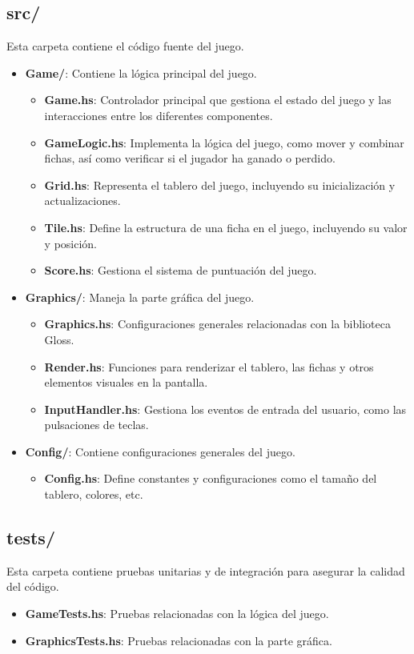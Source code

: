 \documentclass{article}
\begin{document}
\subsection{src/}
Esta carpeta contiene el código fuente del juego.
\begin{itemize}
    \item \textbf{Game/}: Contiene la lógica principal del juego.
    \begin{itemize}
        \item \textbf{Game.hs}: Controlador principal que gestiona el estado del juego y las interacciones entre los diferentes componentes.
        \item \textbf{GameLogic.hs}: Implementa la lógica del juego, como mover y combinar fichas, así como verificar si el jugador ha ganado o perdido.
        \item \textbf{Grid.hs}: Representa el tablero del juego, incluyendo su inicialización y actualizaciones.
        \item \textbf{Tile.hs}: Define la estructura de una ficha en el juego, incluyendo su valor y posición.
        \item \textbf{Score.hs}: Gestiona el sistema de puntuación del juego.
    \end{itemize}
    \item \textbf{Graphics/}: Maneja la parte gráfica del juego.
    \begin{itemize}
        \item \textbf{Graphics.hs}: Configuraciones generales relacionadas con la biblioteca Gloss.
        \item \textbf{Render.hs}: Funciones para renderizar el tablero, las fichas y otros elementos visuales en la pantalla.
        \item \textbf{InputHandler.hs}: Gestiona los eventos de entrada del usuario, como las pulsaciones de teclas.
    \end{itemize}
    \item \textbf{Config/}: Contiene configuraciones generales del juego.
    \begin{itemize}
        \item \textbf{Config.hs}: Define constantes y configuraciones como el tamaño del tablero, colores, etc.
    \end{itemize}
\end{itemize}

\subsection{tests/}
Esta carpeta contiene pruebas unitarias y de integración para asegurar la calidad del código.
\begin{itemize}
    \item \textbf{GameTests.hs}: Pruebas relacionadas con la lógica del juego.
    \item \textbf{GraphicsTests.hs}: Pruebas relacionadas con la parte gráfica.
\end{itemize}
\end{document}
